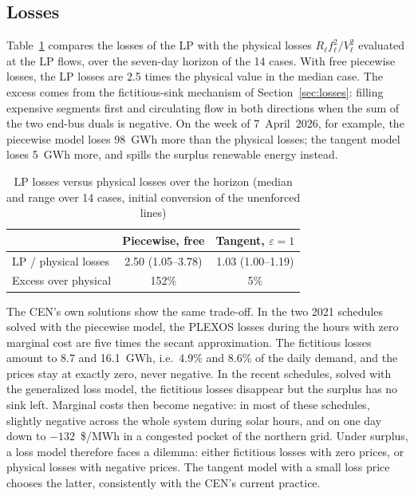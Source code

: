 \subsection{Losses}

Table~\ref{tab:cen_losses} compares the losses of the LP with the
physical losses $R_\ell f_\ell^2/V_\ell^2$ evaluated at the LP flows,
over the seven-day horizon of the 14 cases.  With free piecewise losses,
the LP losses are 2.5 times the physical value in the median case.  The
excess comes from the fictitious-sink mechanism of
Section~\ref{sec:losses}: filling expensive segments first and
circulating flow in both directions when the sum of the two end-bus
duals is negative.  On the week of 7~April~2026, for example, the
piecewise model loses 98~GWh more than the physical losses; the
tangent model loses 5~GWh more, and spills the surplus renewable energy instead.

\begin{table}[t]
  \centering
  \caption{LP losses versus physical losses over the horizon
    (median and range over 14 cases, initial conversion of the
    unenforced lines)}
  \label{tab:cen_losses}
  \begin{tabular}{@{}lcc@{}}
    \toprule
    & Piecewise, free & Tangent, $\varepsilon{=}1$ \\
    \midrule
    LP / physical losses & 2.50 (1.05--3.78) & 1.03 (1.00--1.19) \\
    Excess over physical & 152\% & 5\% \\
    \bottomrule
  \end{tabular}
\end{table}

The CEN's own solutions show the same trade-off.  In the two 2021
schedules solved with the piecewise model, the PLEXOS losses during the
hours with zero marginal cost are five times the secant approximation.
The fictitious losses amount to 8.7 and 16.1~GWh, i.e.\ 4.9\% and 8.6\%
of the daily demand, and the prices stay at exactly zero, never
negative.  In the recent schedules, solved with the generalized loss
model, the fictitious losses disappear but the surplus has no sink
left.  Marginal costs then become negative: in most of these schedules,
slightly negative across the whole system during solar hours, and on
one day down to $-132$~\$/MWh in a congested pocket of the northern
grid.  Under surplus, a loss model therefore faces a dilemma: either
fictitious losses with zero prices, or physical losses with negative
prices.  The tangent model with a small loss price chooses the latter,
consistently with the CEN's current practice.

